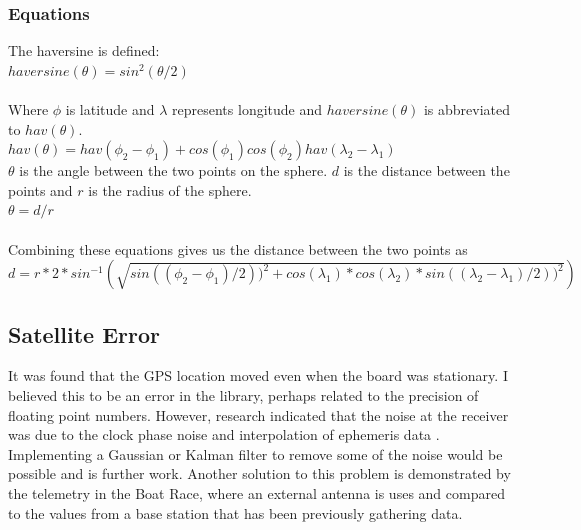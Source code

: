 \documentclass[12pt,a4paper]{report}
\begin{document}
\subsubsection{Equations}
The haversine is defined: \\
$haversine(\theta) = sin^2(\theta/2)$ \\ \\ 
Where $\phi$ is latitude and $\lambda$ represents longitude and $haversine(\theta)$ is abbreviated to $hav(\theta)$. \\
$hav(\theta) = hav(\phi_2 - \phi_1) + cos(\phi_1) cos(\phi_2) hav(\lambda_2 - \lambda_1)$ \\
$\theta$ is the angle between the two points on the sphere. $d$ is the distance between the points and $r$ is the radius of the sphere. \\
$\theta = d / r$ \\ \\ 
Combining these equations gives us the distance between the two points as \\
$d = r * 2 * sin^{-1}(\sqrt{sin((\phi_2 - \phi_1)/2))^2 + cos(\lambda_1) * cos(\lambda_2) * sin((\lambda_2 - \lambda_1)/2))^2})$

\subsection{Satellite Error}
It was found that the GPS location moved even when the board was stationary. I believed this to be an error in the library, perhaps related to the precision of floating point numbers. However, research indicated that the noise at the receiver was due to the clock phase noise and interpolation of ephemeris data \cite{satellite}. Implementing a Gaussian or Kalman filter to remove some of the noise would be possible and is further work. Another solution to this problem is demonstrated by the telemetry in the Boat Race, where an external antenna is uses and compared to the values from a base station that has been previously gathering data.  %
 
\end{document}
